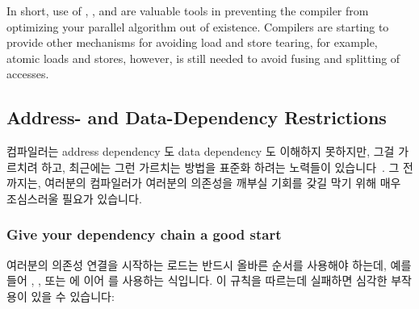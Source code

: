 In short, use of , , and
 are valuable tools in preventing the compiler from
optimizing your parallel algorithm out of existence.
Compilers are starting to provide other mechanisms for avoiding
load and store tearing, for example, 
atomic loads and stores, however,  is still needed
to avoid fusing and splitting of accesses.
\fi

\subsection{Address- and Data-Dependency Restrictions}
\label{sec:memorder:Address- and Data-Dependency Restrictions}

컴파일러는 address dependency 도 data dependency 도 이해하지 못하지만, 그걸
가르치려 하고, 최근에는 그런 가르치는 방법을 표준화 하려는 노력들이
있습니다~\cite{PaulEMcKennneyConsumeP0190R0,PaulEMcKenney2017markconsumeP0462R1}.
그 전까지는, 여러분의 컴파일러가 여러분의 의존성을 깨부실 기회를 갖길 막기 위해
매우 조심스러울 필요가 있습니다.

\subsubsection{Give your dependency chain a good start}
여러분의 의존성 연결을 시작하는 로드는 반드시 올바른 순서를 사용해야 하는데,
예를 들어 , , 또는
 에 이어  를 사용하는 식입니다.
이 규칙을 따르는데 실패하면 심각한 부작용이 있을 수 있습니다:

